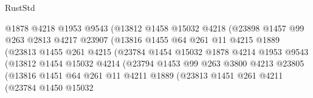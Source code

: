 \begin{lexlean}{RustStd}
\begin{coremodule}
                              @1878
                              @4218
                              @1953
                              @9543
                              (@13812
                                @1458
                                @15032
                                @4218
                                (@23898
                                  @1457
                                  @99
                                  @263
                                  @2813
                                  @4217
                                  @23907
                                  (@13816
                                    @1455
                                    @64
                                    @261
                                    @11
                                    @4215
                                    @1889
                                    (@23813
                                      @1455
                                      @261
                                      @4215
                                      (@23784
                                        @1454
                                        @15032
                                        @1878
                                        @4214
                                        @1953
                                        @9543
                                        (@13812
                                          @1454
                                          @15032
                                          @4214
                                          (@23794
                                            @1453
                                            @99
                                            @263
                                            @3800
                                            @4213
                                            @23805
                                            (@13816
                                              @1451
                                              @64
                                              @261
                                              @11
                                              @4211
                                              @1889
                                              (@23813
                                                @1451
                                                @261
                                                @4211
                                                (@23784
                                                  @1450
                                                  @15032

\end{coremodule}
\end{lexlean}
